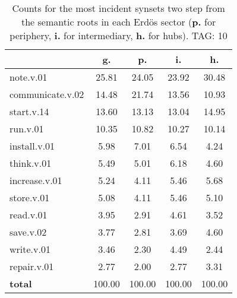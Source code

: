 \begin{table}[h!]
\begin{center}
\begin{tabular}{| l | c | c | c | c |}\hline
 & g. & p. & i. & h. \\\hline
note.v.01 & 25.81  & 24.05  & 23.92  & 30.48 \\\hline
communicate.v.02 & 14.48  & 21.74  & 13.56  & 10.93 \\\hline
start.v.14 & 13.60  & 13.13  & 13.04  & 14.95 \\\hline
run.v.01 & 10.35  & 10.82  & 10.27  & 10.14 \\\hline
install.v.01 & 5.98  & 7.01  & 6.54  & 4.24 \\\hline
think.v.01 & 5.49  & 5.01  & 6.18  & 4.60 \\\hline
increase.v.01 & 5.24  & 4.11  & 5.46  & 5.68 \\\hline
store.v.01 & 5.08  & 4.11  & 5.46  & 5.10 \\\hline
read.v.01 & 3.95  & 2.91  & 4.61  & 3.52 \\\hline
save.v.02 & 3.77  & 2.81  & 3.69  & 4.60 \\\hline
write.v.01 & 3.46  & 2.30  & 4.49  & 2.44 \\\hline
repair.v.01 & 2.77  & 2.00  & 2.77  & 3.31 \\\hline
{{\bf total}} & 100.00  & 100.00  & 100.00  & 100.00 \\\hline
\end{tabular}
\caption{Counts for the most incident synsets two step from the semantic roots in each Erd\"os sector ({\bf p.} for periphery, {\bf i.} for intermediary, {\bf h.} for hubs). TAG: 10}
\end{center}
\end{table}